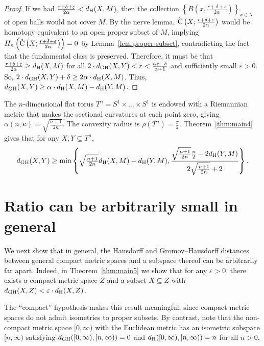 \documentclass[11pt, reqno, english]{amsart}
\begin{document}
\begin{proof}
If we had $\frac{r+\delta+\varepsilon}{2\alpha} < d_{\mathrm{H}}(X,M)$, then the collection $\left\{B\left(x,\frac{r+\delta+\varepsilon}{2\alpha}\right)\right\}_{x\in X}$ of open balls would not cover $M$.
By the nerve lemma, $\mathrm{\check{C}}\left(X;\frac{r+\delta+\varepsilon}{2\alpha}\right)$ would be homotopy equivalent to an open proper subset of $M$, implying $H_n\left(\mathrm{\check{C}}\left(X;\frac{r+\delta+\varepsilon}{2\alpha}\right)\right)=0$ by Lemma~\ref{lem:proper-subset}, contradicting the fact that the fundamental class is preserved.
Therefore, it must be that $\frac{r+\delta+\varepsilon}{2\alpha} \ge d_{\mathrm{H}}(X,M)$ for all $2\cdot d_{\mathrm{GH}}(X,Y) < r < \frac{\alpha\tau-\delta}{\alpha+1}$ and sufficiently small $\varepsilon>0$.
So, $2 \cdot d_{\mathrm{GH}}(X,Y)+\delta \ge 2\alpha\cdot d_{\mathrm{H}}(X,M)$.
Thus, $d_{\mathrm{GH}}(X,Y) \ge \alpha \cdot d_{\mathrm{H}}(X,M)-d_{\mathrm{H}}(Y,M)$.
\end{proof}

\begin{example}
\label{ex:tori}
The $n$-dimensional flat torus $T^n= S^1\times\ldots\times S^1$ is endowed with a Riemannian metric that makes the sectional curvatures at each point zero, giving $\alpha(n,\kappa)=\sqrt{\tfrac{n+1}{2n}}$.
The convexity radius is $\rho(T^n)=\frac{\pi}{2}$.
Theorem~\ref{thm:main4} gives that for any $X,Y\subseteq T^n$,
\[d_{\mathrm{GH}}(X,Y) \geq \min\left\{\sqrt{\tfrac{n+1}{2n}}d_{\mathrm{H}}(X,M)-d_{\mathrm{H}}(Y,M),\frac{\sqrt{\tfrac{n+1}{2n}}\tfrac{\pi}{2}-2d_{\mathrm{H}}(Y,M)}{2\sqrt{\tfrac{n+1}{2n}}+2}\right\}.\]
\end{example}



\section{Ratio can be arbitrarily small in general}
\label{sec:ratio}

We next show that in general, the Hausdorff and Gromov--Hausdorff distances between general compact metric spaces and a subspace thereof can be arbitrarily far apart.
Indeed, in Theorem~\ref{thm:main5} we show that for any $\varepsilon>0$, there exists a compact metric space $Z$ and a subset $X\subseteq Z$ with $d_{\mathrm{GH}}(X,Z) < \varepsilon \cdot d_{\mathrm{H}}(X,Z)$.

The ``compact'' hypothesis makes this result meaningful, since compact metric spaces do not admit isometries to proper subsets.
By contrast, note that the non-compact metric space $[0,\infty)$ with the Euclidean metric has an isometric subspace $[n,\infty)$ satisfying $d_{\mathrm{GH}}([0,\infty),[n,\infty))=0$ and $d_{\mathrm{H}}([0,\infty),[n,\infty))=n$ for all $n>0$.
\end{document}
